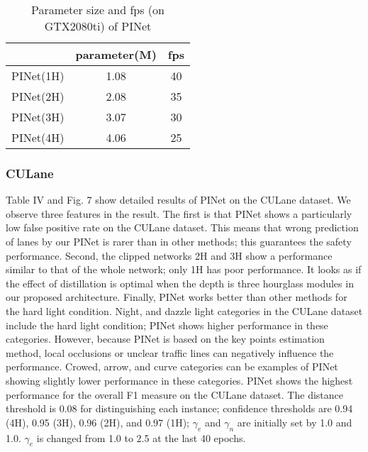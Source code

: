 \documentclass[journal]{IEEEtran}
\begin{document}
\begin{table}[ht]
    \caption{Parameter size and fps (on GTX2080ti) of PINet}
    \begin{center}
        \begin{tabular}{|c|c|c|}
            \hline
            & parameter(M) & fps\\
            \hline
            \hline
            PINet(1H) & 1.08 & 40\\
            \hline
            PINet(2H) & 2.08 & 35\\
            \hline
            PINet(3H) & 3.07 & 30\\
            \hline
            PINet(4H) & 4.06 & 25\\
            \hline
        \end{tabular}
    \end{center}
\end{table}

\subsubsection{CULane}
Table IV and Fig. 7 show detailed results of PINet on the CULane dataset. We observe three features in the result. The first is that PINet shows a particularly low false positive rate on the CULane dataset. This means that wrong prediction of lanes by our PINet is rarer than in other methods; this guarantees the safety performance. Second, the clipped networks 2H and 3H show a performance similar to that of the whole network; only 1H has poor performance. It looks as if the effect of distillation is optimal when the depth is three hourglass modules in our proposed architecture. Finally, PINet works better than other methods for the hard light condition. Night, and dazzle light categories in the CULane dataset include the hard light condition; PINet shows higher performance in these categories. However, because PINet is based on the key points estimation method, local occlusions or unclear traffic lines can negatively influence the performance. Crowed, arrow, and curve categories can be examples of PINet showing slightly lower performance in these categories. PINet shows the highest performance for the overall F1 measure on the CULane dataset. The distance threshold is 0.08 for distinguishing each instance; confidence thresholds are 0.94 (4H), 0.95 (3H), 0.96 (2H), and 0.97 (1H); $\gamma_e$ and $\gamma_n$ are initially set by 1.0 and 1.0. $\gamma_e$ is changed from 1.0 to 2.5 at the last 40 epochs.
\end{document}
